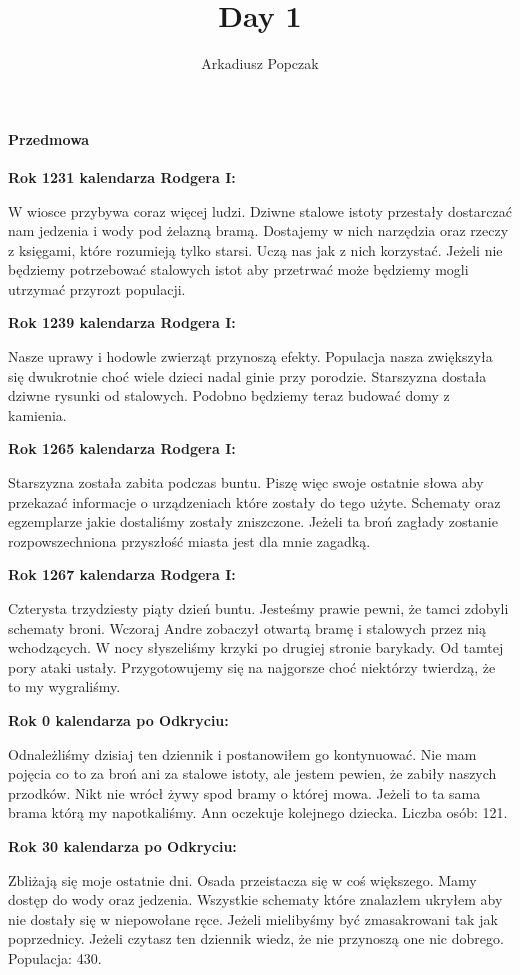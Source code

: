 \documentclass{article}
\title{\Huge{Day 1}}
\author{Arkadiusz Popczak}
\date{}
\newcommand{\paragraphx}[1]{
        \paragraph{\Large{{#1}}}\mbox{}

    }
\newcommand{\textbb}[1]{
        \smallskip
        \textbf{{#1}}
        \smallskip
    }
\begin{document}
    \maketitle

    \paragraphx{Przedmowa}
    \textbb{Rok 1231 kalendarza Rodgera I:}

    W wiosce przybywa coraz więcej ludzi. Dziwne stalowe istoty przestały dostarczać nam jedzenia i wody pod żelazną bramą. Dostajemy w nich narzędzia oraz rzeczy z księgami, które rozumieją tylko starsi. Uczą nas jak z nich korzystać. Jeżeli nie będziemy potrzebować stalowych istot aby przetrwać może będziemy mogli utrzymać przyrozt populacji.

    \textbb{Rok 1239 kalendarza Rodgera I:}

    Nasze uprawy i hodowle zwierząt przynoszą efekty. Populacja nasza zwiększyła się dwukrotnie choć wiele dzieci nadal ginie przy porodzie. Starszyzna dostała dziwne rysunki od stalowych. Podobno będziemy teraz budować domy z kamienia.

    \textbb{Rok 1265 kalendarza Rodgera I:}

    Starszyzna została zabita podczas buntu. Piszę więc swoje ostatnie słowa aby przekazać informacje o urządzeniach które zostały do tego użyte. Schematy oraz egzemplarze jakie dostaliśmy zostały zniszczone. Jeżeli ta broń zagłady zostanie rozpowszechniona przyszłość miasta jest dla mnie zagadką.

    \textbb{Rok 1267 kalendarza Rodgera I:}

    Czterysta trzydziesty piąty dzień buntu. Jesteśmy prawie pewni, że tamci zdobyli schematy broni. Wczoraj Andre zobaczył otwartą bramę i stalowych przez nią wchodzących. W nocy słyszeliśmy krzyki po drugiej stronie barykady. Od tamtej pory ataki ustały. Przygotowujemy się na najgorsze choć niektórzy twierdzą, że to my wygraliśmy.

   \textbb{Rok 0 kalendarza po Odkryciu:}

   Odnależliśmy dzisiaj ten dziennik i postanowiłem go kontynuować. Nie mam pojęcia co to za broń ani za stalowe istoty, ale jestem pewien, że zabiły naszych przodków. Nikt nie wrócł żywy spod bramy o której mowa. Jeżeli to ta sama brama którą my napotkaliśmy. Ann oczekuje kolejnego dziecka. Liczba osób: 121.

    \textbb{Rok 30 kalendarza po Odkryciu:}

    Zbliżają się moje ostatnie dni. Osada przeistacza się w coś większego. Mamy dostęp do wody oraz jedzenia. Wszystkie schematy które znalazłem ukryłem aby nie dostały się w niepowołane ręce. Jeżeli mielibyśmy być zmasakrowani tak jak poprzednicy. Jeżeli czytasz ten dziennik wiedz, że nie przynoszą one nic dobrego. Populacja: 430.
\end{document}
